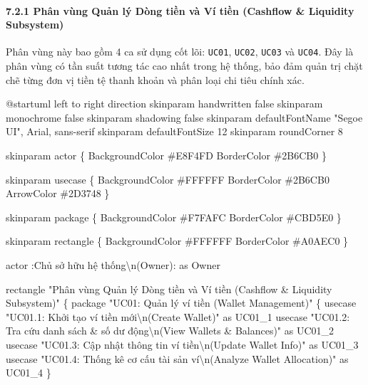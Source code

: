 \documentclass[11pt,a4paper]{article}
\newenvironment{Shaded}{}{}
\newcommand{\NormalTok}[1]{#1}
\begin{document}
\paragraph{7.2.1 Phân vùng Quản lý Dòng tiền và Ví tiền (Cashflow \&
Liquidity
Subsystem)}\label{721-phuxe2n-vuxf9ng-quux1ea3n-luxfd-duxf2ng-tiux1ec1n-vuxe0-vuxed-tiux1ec1n-cashflow--liquidity-subsystem}

Phân vùng này bao gồm 4 ca sử dụng cốt lõi: \texttt{UC01},
\texttt{UC02}, \texttt{UC03} và \texttt{UC04}. Đây là phân vùng có tần
suất tương tác cao nhất trong hệ thống, bảo đảm quản trị chặt chẽ từng
đơn vị tiền tệ thanh khoản và phân loại chi tiêu chính xác.

\iffalse
\begin{Shaded}
\begin{Highlighting}[]
\NormalTok{@startuml}
\NormalTok{left to right direction}
\NormalTok{skinparam handwritten false}
\NormalTok{skinparam monochrome false}
\NormalTok{skinparam shadowing false}
\NormalTok{skinparam defaultFontName "Segoe UI", Arial, sans{-}serif}
\NormalTok{skinparam defaultFontSize 12}
\NormalTok{skinparam roundCorner 8}

\NormalTok{skinparam actor \{}
\NormalTok{    BackgroundColor \#E8F4FD}
\NormalTok{    BorderColor \#2B6CB0}
\NormalTok{\}}

\NormalTok{skinparam usecase \{}
\NormalTok{    BackgroundColor \#FFFFFF}
\NormalTok{    BorderColor \#2B6CB0}
\NormalTok{    ArrowColor \#2D3748}
\NormalTok{\}}

\NormalTok{skinparam package \{}
\NormalTok{    BackgroundColor \#F7FAFC}
\NormalTok{    BorderColor \#CBD5E0}
\NormalTok{\}}

\NormalTok{skinparam rectangle \{}
\NormalTok{    BackgroundColor \#FFFFFF}
\NormalTok{    BorderColor \#A0AEC0}
\NormalTok{\}}

\NormalTok{actor :Chủ sở hữu hệ thống\textbackslash{}n(Owner): as Owner}

\NormalTok{rectangle "Phân vùng Quản lý Dòng tiền và Ví tiền (Cashflow \& Liquidity Subsystem)" \{}
\NormalTok{    package "UC01: Quản lý ví tiền (Wallet Management)" \{}
\NormalTok{        usecase "UC01.1: Khởi tạo ví tiền mới\textbackslash{}n(Create Wallet)" as UC01\_1}
\NormalTok{        usecase "UC01.2: Tra cứu danh sách \& số dư động\textbackslash{}n(View Wallets \& Balances)" as UC01\_2}
\NormalTok{        usecase "UC01.3: Cập nhật thông tin ví tiền\textbackslash{}n(Update Wallet Info)" as UC01\_3}
\NormalTok{        usecase "UC01.4: Thống kê cơ cấu tài sản ví\textbackslash{}n(Analyze Wallet Allocation)" as UC01\_4}
\NormalTok{    \}}


\end{Highlighting}
\end{Shaded}
\end{document}
